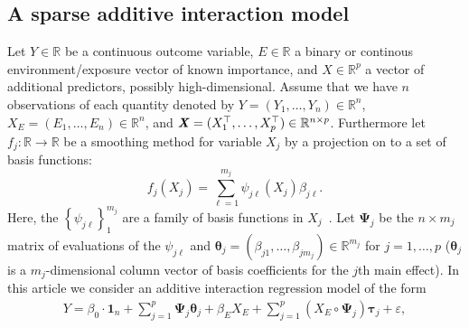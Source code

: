 \documentclass[a4paper,fleqn]{cas-sc}
\newcommand{\bX}{\textbf{\emph{X}}}
\newcommand{\btau}{\boldsymbol{\tau}}
\newcommand{\e}{{\mathsf E}}
\newcommand{\bmu}{\boldsymbol{\mu}}
\newcommand{\btheta}{\boldsymbol{\theta}}
\newcommand{\bPsi}{\boldsymbol{\Psi}}
\begin{document}
\subsection{A sparse additive interaction model}
Let $Y \in \mathbb{R}$ be a continuous outcome variable, $E\in \mathbb{R}$ a binary or continous environment/exposure vector of known importance, and $X\in \mathbb{R}^p$ a vector of additional predictors, possibly high-dimensional. Assume that we have $n$ observations of each quantity denoted by $Y=(Y_1, \ldots, Y_n) \in \mathbb{R}^n$, \mbox{$X_E=(E_1, \ldots, E_n) \in \mathbb{R}^n$}, and \mbox{$\bX = (X_{1}^\top, \ldots, X_{p}^\top) \in \mathbb{R}^{n\times p}$}. Furthermore let $f_j: \mathbb{R} \rightarrow \mathbb{R}$ be a smoothing method for variable $X_j$ by a projection on to a set of basis functions:
\begin{equation}
f_j(X_j) = \sum_{\ell = 1}^{m_j} \psi_{j\ell}(X_j) \beta_{j\ell}. \label{eq:smooth}
\end{equation}
Here, the $\left\lbrace \psi_{j\ell} \right\rbrace_1^{m_j}$ are a family of basis functions in $X_j$~\citep{hastie2015statistical}. Let $\bPsi_j$ be the $n \times m_j$ matrix of evaluations of the $\psi_{j\ell}$ and \mbox{$\btheta_j = (\beta_{j1}, \ldots, \beta_{jm_j}) \in \mathbb{R}^{m_j}$} for $j = 1, \ldots, p$ ($\btheta_j$ is a $m_j$-dimensional column vector of basis coefficients for the $j$th main effect). 
In this article we consider an additive interaction regression model of the form
\begin{align}
Y = \beta_0 \cdot \boldsymbol{1}_n + \sum_{j=1}^p \bPsi_j \btheta_j + \beta_E X_E + \sum_{j=1}^p (X_E \circ \bPsi_j) \btau_j + \varepsilon , \label{eq:linpred}
\end{align}
\end{document}
